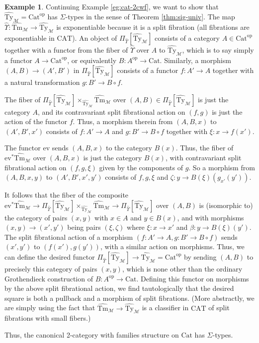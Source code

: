 \documentclass[10pt]{article}
\theoremstyle{definition}
\newtheorem{example}{Example}
\newcommand\op{^{\mathrm{op}}}
\newcommand\Cat{\mathrm{Cat}}
\newcommand\CAT{\mathrm{CAT}}
\newcommand\M{\mathcal{M}}
\newcommand\Mtyhat{{\widehat{\mathrm{Ty}}_{\M}}}
\newcommand\Mtmhat{{\widehat{\mathrm{Tm}}_{\M}}}
\newcommand\Upshat{{\widehat{\Upsilon}}}
\newcommand\ev{\mathrm{ev}}
\begin{document}
\begin{example}\label{eg:cat-sig}
  Continuing Example \ref{eg:cat-2cwf}, we want to show that $\Mtyhat=\Cat\op$ has $\Sigma$-types in the sense of Theorem \ref{thm:sig-univ}.
  The map $\Upshat:\Mtmhat\to \Mtyhat$ is exponentiable because it is a split fibration (all fibrations are exponentiable in $\CAT$).
  An object of $\Pi_\Upshat[\Mtyhat]$ consists of a category $A\in \Cat\op$ together with a functor from the fiber of $\Upshat$ over $A$ to $\Mtyhat$, which is to say simply a functor $A\to \Cat\op$, or equivalently $B:A\op\to\Cat$.
  Similarly, a morphism $(A,B)\to (A',B')$ in $\Pi_\Upshat[\Mtyhat]$ consists of a functor $f:A'\to A$ together with a natural transformation $g:B' \to B \circ f$.

  The fiber of $\Pi_\Upshat[\Mtyhat] \times_\Mtyhat \Mtmhat$ over $(A,B)\in \Pi_\Upshat[\Mtyhat]$ is just the category $A$, and its contravariant split fibrational action on $(f,g)$ is just the action of the functor $f$.
  Thus, a morphism therein from $(A,B,x)$ to $(A',B',x')$ consists of $f:A'\to A$ and $g:B' \to B \circ f$ together with $\xi : x \to f(x')$.

  The functor $\ev$ sends $(A,B,x)$ to the category $B(x)$.
  Thus, the fiber of $\ev^*\Mtmhat$ over $(A,B,x)$ is just the category $B(x)$, with contravariant split fibrational action on $(f,g,\xi)$ given by the components of $g$.
  So a morphism from $(A,B,x,y)$ to $(A',B',x',y')$ consists of $f,g,\xi$ and $\zeta : y \to B(\xi)(g_{x'}(y'))$.

  It follows that the fiber of the composite $\ev^*\Mtmhat \to \Pi_\Upshat[\Mtyhat] \times_\Mtyhat \Mtmhat \to \Pi_\Upshat[\Mtyhat]$ over $(A,B)$ is (isomorphic to) the category of pairs $(x,y)$ with $x\in A$ and $y\in B(x)$, and with morphisms $(x,y)\to (x',y')$ being pairs $(\xi,\zeta)$ where $\xi:x\to x'$ and $\beta: y \to B(\xi)(y')$.
  The split fibrational action of a morphism $(f:A'\to A,g:B' \to B \circ f)$ sends $(x',y')$ to $(f(x'),g(y'))$, with a similar action on morphisms.
  Thus, we can define the desired functor $\Pi_\Upshat[\Mtyhat] \to \Mtyhat = \Cat\op$ by sending $(A,B)$ to precisely this category of pairs $(x,y)$, which is none other than the ordinary Grothendieck construction of $B:A\op\to \Cat$.
  Defining this functor on morphisms by the above split fibrational action, we find tautologically that the desired square is both a pullback and a morphism of split fibrations.
  (More abstractly, we are simply using the fact that $\Mtmhat\to \Mtyhat$ is a classifier in $\CAT$ of split fibrations with small fibers.)

  Thus, the canonical 2-category with families structure on $\Cat$ has $\Sigma$-types.
\end{example}
\end{document}
